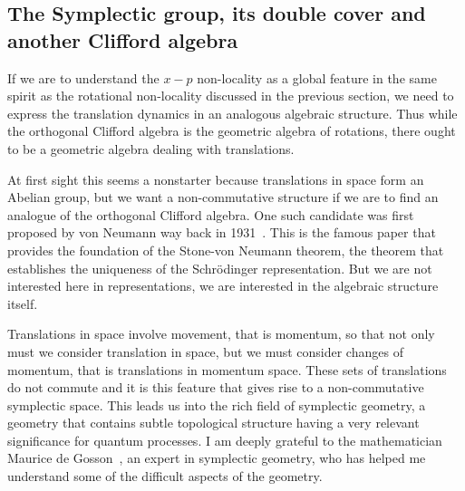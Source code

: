 \documentclass[11pt]{article}
\begin{document}
\subsection{The Symplectic group, its double cover and another Clifford algebra}

If we are to understand the $x - p$ non-locality as a global feature in the same spirit as the rotational non-locality discussed in the previous section, we need to express the translation dynamics in an analogous algebraic structure. Thus while the orthogonal Clifford algebra is the geometric algebra of rotations, there ought to be a geometric algebra dealing with translations. 

At first sight this seems a nonstarter because translations in space form an Abelian group, but we want a non-commutative structure if we are to find an analogue of the orthogonal Clifford algebra.  One such candidate was first proposed by von Neumann way back in 1931~\cite{vn31}.  This is the famous paper that provides the foundation of the Stone-von Neumann theorem, the theorem that establishes the uniqueness of the Schr\"{o}dinger representation.  But we are not interested here in representations, we are interested in the algebraic structure itself.


Translations in space involve movement, that is momentum, so that not only must we consider translation in space, but we must consider  changes of momentum, that is translations in momentum space.  These sets of translations do not commute and it is this feature that gives rise to   a non-commutative symplectic space. This leads us into the rich field of symplectic geometry, a geometry that contains subtle topological structure having a very relevant significance for quantum processes.  I am deeply grateful to the mathematician Maurice de Gosson~\cite{mdg01, mdg10}, an expert in symplectic geometry, who has helped me understand some of the difficult aspects of the geometry.
\end{document}
